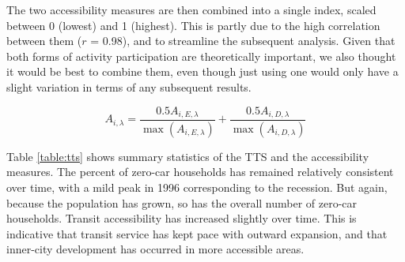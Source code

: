The two accessibility measures are then combined into a single index, scaled between 0 (lowest) and 1 (highest). This is partly due to the high correlation between them ($r$ = 0.98), and to streamline the subsequent analysis. Given that both forms of activity participation are theoretically important, we also thought it would be best to combine them, even though just using one would only have a slight variation in terms of any subsequent results.

\begin{equation}
A_{i,\lambda} =  \frac{0.5 A_{i,E,\lambda}}{\max{(A_{i,E,\lambda})}} + \frac{0.5 A_{i,D,\lambda}}{\max{(A_{i,D,\lambda})}}
\end{equation}

Table \ref{table:tts} shows summary statistics of the TTS and the accessibility measures. The percent of zero-car households has remained relatively consistent over time, with a mild peak in 1996 corresponding to the recession. But again, because the population has grown, so has the overall number of zero-car households. Transit accessibility has increased slightly over time. This is indicative that transit service has kept pace with outward expansion, and that inner-city development has occurred in more accessible areas. 



